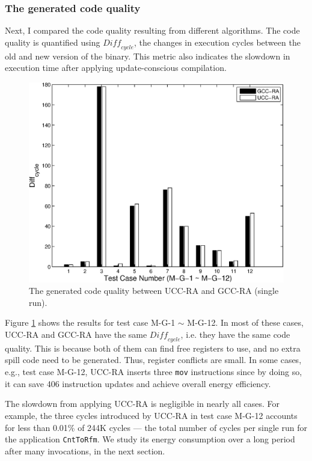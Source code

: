 \subsubsection{The generated code quality}
Next, I compared the code quality resulting from different
algorithms. The code quality is quantified using $\textit{Diff}_{cycle}$, the
changes in execution cycles between the old and new version of the
binary. This metric also indicates the slowdown in execution time
after applying update-conscious compilation.

\begin{figure}[htbp]
\centering
\includegraphics[scale=0.6]{figures/prof.eps}
\caption{The generated code quality between UCC-RA and GCC-RA (single run).}
\label{fexp.perf}
\end{figure}

Figure \ref{fexp.perf} shows the results for test case M-G-1 $\sim$ M-G-12. In
most of these cases, UCC-RA and GCC-RA have the same $\textit{Diff}_{cycle}$,
i.e. they have the same code quality. This is because both of them can
find free registers to use, and no extra spill code need to be
generated. Thus, register conflicts are small.  In some cases, e.g.,
test case M-G-12, UCC-RA inserts three {\tt mov} instructions since by
doing so, it can save 406 instruction updates and achieve overall
energy efficiency.

The slowdown from applying UCC-RA is negligible in nearly
all cases. For example, the three cycles introduced by UCC-RA in test
case M-G-12 accounts for less than 0.01\% of 244K cycles --- the total
number of cycles per single run for the application {\tt CntToRfm}. We
study its energy consumption over a long period after many
invocations, in the next section.

